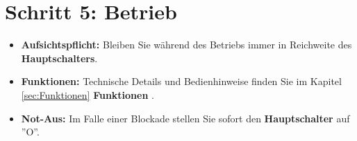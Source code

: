 \section{Schritt 5: Betrieb}

\begin{itemize}
	\item \textbf{Aufsichtspflicht:} Bleiben Sie während des Betriebs immer in Reichweite des \textbf{Hauptschalters}.
	
	\item \textbf{Funktionen:} Technische Details und Bedienhinweise finden Sie im Kapitel \ref{sec:Funktionen} \textbf{Funktionen} .
	
	\item \textbf{Not-Aus:} Im Falle einer Blockade stellen Sie sofort den \textbf{Hauptschalter} auf ''O''.
	
\end{itemize}
